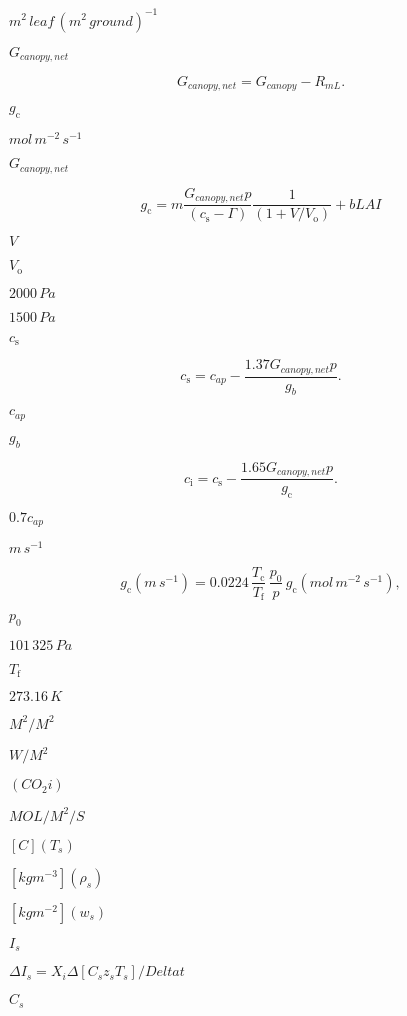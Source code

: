 \documentclass{article}
\begin{document}
{$m^{2}\,leaf\,(m^{2}\,ground)^{-1}$
\pagebreak

$G_{canopy,net}$
\pagebreak

\[ \label{Gnet} G_{canopy,net} = G_{canopy} - R_{mL}. \]
\pagebreak

$g_\mathrm{c}$
\pagebreak

$mol\,m^{-2}\,s^{-1}$
\pagebreak

$G_{canopy, net}$
\pagebreak

\[ \label{canopy_cond} g_\mathrm{c} = m \frac{G_{canopy,net} p}{(c_\mathrm{s} - \Gamma)}\frac{1}{(1+V/V_\mathrm{o})} + b {LAI} \]
\pagebreak

$V$
\pagebreak

$V_\mathrm{o}$
\pagebreak

$2000\,Pa$
\pagebreak

$1500\,Pa$
\pagebreak

$c_\mathrm{s}$
\pagebreak

\[ \label{c_s} c_\mathrm{s} = c_{ap} - \frac{1.37 G_{canopy,net} p}{g_b}. \]
\pagebreak

$c_{ap}$
\pagebreak

$g_b$
\pagebreak

\[ \label{c_i} c_\mathrm{i} = c_\mathrm{s} - \frac{1.65 G_{canopy,net} p}{g_\mathrm{c}}. \]
\pagebreak

$0.7c_{ap}$
\pagebreak

$m\,s^{-1}$
\pagebreak

\[ g_\mathrm{c} (m\,s^{-1}) = 0.0224\,\frac{T_\mathrm{c}}{T_\mathrm{f}}\,\frac{p_0}{p}\,g_\mathrm{c} (mol\,m^{-2}\,s^{-1}), \]
\pagebreak

$p_0$
\pagebreak

$101\,325\,Pa$
\pagebreak

$T_\mathrm{f}$
\pagebreak

$273.16\,K$
\pagebreak

$M^2/M^2$
\pagebreak

$W/M^2$
\pagebreak

$(CO_2i)$
\pagebreak

$MOL/M^2/S$
\pagebreak

$[C] (T_s)$
\pagebreak

$[kg m^{-3}] (\rho_s )$
\pagebreak

$[kg m^{-2}] (w_s)$
\pagebreak

$I_s$
\pagebreak

$\Delta I_s = X_i \Delta [C_s z_s T_s]/Delta t$
\pagebreak

$C_s$
\pagebreak

}
\end{document}
